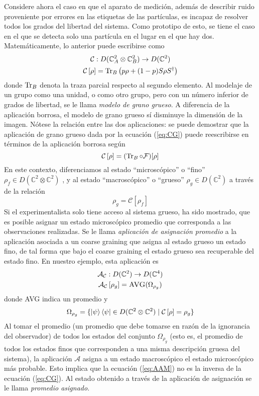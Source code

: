 \documentclass[onecolumn,11pt]{article}
\newcommand{\mcF}{\mathcal{F}}
\newcommand{\mcC}{\mathcal{C}}
\newcommand{\mcA}{\mathcal{A}}
\newcommand{\Complex}{\mathbb{C}} %
\newcommand{\CG}[1]{\mcC\left[#1\right]}
\begin{document}
Considere ahora el caso en que el aparato de medición, además de describir ruido proveniente por errores en las etiquetas de las partículas, es incapaz de resolver todos los grados del libertad del sistema. Como prototipo de esto, se tiene el caso en el que se detecta solo una partícula en el lugar en el que hay dos. Matemáticamente, lo anterior puede escribirse como
\begin{gather}
\mcC:D(\Complex^{2}_{A}\otimes\Complex^{2}_{B})\rightarrow D(\Complex^{2})\label{eq:CGDom}\\
\mcC\left[\rho\right]=\Tr_{B}\left(p\rho+(1-p)S\rho S^{\dag}\right)\label{eq:CG}
\end{gather}
donde $\Tr_{B}$ denota la traza parcial respecto al segundo elemento. Al modelaje de un grupo como una unidad, o como otro grupo, pero con un número inferior de grados de libertad, se le llama \textit{modelo de grano grueso}. A diferencia de la aplicación borrosa, el modelo de grano grueso sí disminuye la dimensión de la imagen. Nótese la relación entre las dos aplicaciones: se puede demostrar\cite{FuzzyMeasurements} que la aplicación de grano grueso dada por la ecuación (\ref{eq:CG}) puede reescribirse en términos de la aplicación borrosa según
\begin{equation}
\CG{\rho}=(\Tr_{B}\circ\mcF)[\rho]
\end{equation}
En este contexto, diferenciamos al estado ``microscópico'' o ``fino'' $\rho_{f}\in D(\Complex^{2}\otimes\Complex^{2})$ , y al estado ``macroscópico'' o ``grueso'' $\rho_{g}\in D(\Complex^{2})$ a través de la relación
\begin{equation}
    \rho_{g}=\CG{\rho_{f}}
\end{equation}
Si el experimentalista solo tiene acceso al sistema grueso, ha sido mostrado\cite{Macro-To-Micro}, que es posible asignar un estado microscópico promedio que corresponda a las observaciones realizadas. Se le llama \textit{aplicación de asignación promedio} a la aplicación asociada a un coarse graining que asigna al estado grueso un estado fino, de tal forma que bajo el coarse graining el estado grueso sea recuperable del estado fino. En nuestro ejemplo, esta aplicación es
\begin{gather}
\mcA_{\mcC}:D(\Complex^{2})\rightarrow D(\Complex^{4})\label{eq:AAMDom}\\
\mcA_{\mcC}\left[\rho_{g}\right]=\textsc{AVG}(\Omega_{\rho_{g}})\label{eq:AAM}
\end{gather}
donde \textsc{AVG} indica un promedio y
\begin{equation}
\Omega_{\rho_{g}}=\{\ket{\psi}\bra{\psi}\in D(\Complex^{2}\otimes\Complex^{2}) \mid \CG{\rho}=\rho_{g}\}
\end{equation}
Al tomar el promedio (un promedio que debe tomarse en razón de la ignorancia del observador) de todos los estados del conjunto $\Omega_{\rho_{g}}$ (esto es, el promedio de todos los estados finos que corresponden a una misma descripción gruesa del sistema), la aplicación $\mcA$ asigna a un estado macroscópico el estado microscópico más probable. Esto implica que la ecuación (\ref{eq:AAM}) no es la inversa de la ecuación (\ref{eq:CG}). Al estado obtenido a través de la aplicación de asignación se le llama \textit{promedio asignado}.
\vspace{0.5cm}
\end{document}
